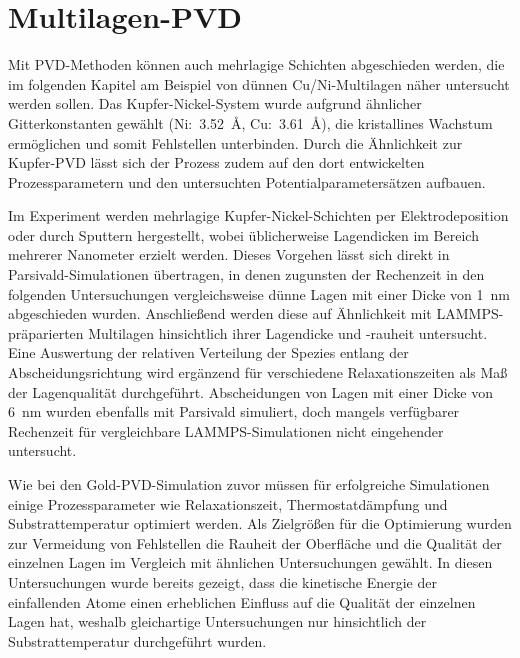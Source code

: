 \section{Multilagen-PVD}
\label{multilayer}

Mit PVD-Methoden können auch mehrlagige Schichten abgeschieden werden, die im folgenden Kapitel am Beispiel von dünnen Cu/Ni-Multilagen näher untersucht werden sollen.
Das Kupfer-Nickel-System wurde aufgrund ähnlicher Gitterkonstanten gewählt (Ni:~\SI{3.52}{\angstrom}, Cu:~\SI{3.61}{\angstrom}), die kristallines Wachstum ermöglichen und somit Fehlstellen unterbinden.
Durch die Ähnlichkeit zur Kupfer-PVD lässt sich der Prozess zudem auf den dort entwickelten Prozessparametern und den untersuchten Potentialparametersätzen aufbauen.

Im Experiment werden mehrlagige Kupfer-Nickel-Schichten per Elektro\-deposition\cite{yang_pulsed_1995} oder durch Sputtern\cite{cammarata_nanoindentation_1990} hergestellt, wobei üblicherweise Lagendicken im Bereich mehrerer Nanometer erzielt werden.
Dieses Vorgehen lässt sich direkt in Parsivald-Simulationen übertragen, in denen zugunsten der Rechenzeit in den folgenden Untersuchungen vergleichsweise dünne Lagen mit einer Dicke von \SI{1}{\nano\meter} abgeschieden wurden.
Anschließend werden diese auf Ähnlichkeit mit LAMMPS-präparierten Multilagen hinsichtlich ihrer Lagendicke und -rauheit untersucht.
Eine Auswertung der relativen Verteilung der Spezies entlang der Abscheidungsrichtung wird ergänzend für verschiedene Relaxationszeiten als Maß der Lagenqualität durchgeführt.
Abscheidungen von Lagen mit einer Dicke von \SI{6}{\nano\meter} wurden ebenfalls mit Parsivald simuliert, doch mangels verfügbarer Rechenzeit für vergleichbare LAMMPS-Simulationen nicht eingehender untersucht.

Wie bei den Gold-PVD-Simulation zuvor müssen für erfolgreiche Simulationen einige Prozessparameter wie Relaxationszeit, Thermostatdämpfung und Substrattemperatur optimiert werden.
Als Zielgrößen für die Optimierung wurden zur Vermeidung von Fehlstellen die Rauheit der Oberfläche und die Qualität der einzelnen Lagen im Vergleich mit ähnlichen Untersuchungen\cite{zhou_atomistic_1998} gewählt.
In diesen Untersuchungen wurde bereits gezeigt, dass die kinetische Energie der einfallenden Atome einen erheblichen Einfluss auf die Qualität der einzelnen Lagen hat, weshalb gleichartige Untersuchungen nur hinsichtlich der Substrattemperatur durchgeführt wurden.

